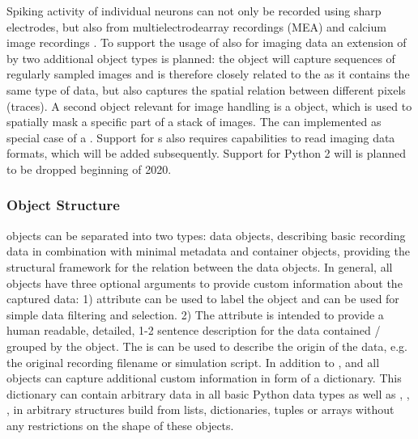 Spiking activity of individual neurons can not only be recorded using sharp electrodes, but also  from multielectrodearray recordings (MEA) and calcium image recordings \citep{kelly_comparison_2007, shew_simultaneous_2010}. To support the usage of  also for imaging data an extension of  by two additional object types is planned: the  object will capture sequences of regularly sampled images and is therefore closely related to the  as it contains the same type of data, but also captures the spatial relation between different pixels (traces). A second object relevant for image handling is a  object, which is used to spatially mask a specific part of a stack of images. The  can implemented as special case of a . Support for s also requires capabilities to read imaging data formats, which will be added subsequently.
Support for Python 2 will is planned to be dropped beginning of 2020.


\subsubsection{ Object Structure}
 objects can be separated into two types: data objects, describing basic recording data in combination with minimal metadata and container objects, providing the structural framework for the relation between the data objects. In general, all  objects have three optional arguments to provide custom information about the captured data: 1)  attribute can be used to label the object and can be used for simple data filtering and selection. 2) The  attribute is intended to provide a human readable, detailed, 1-2 sentence description for the data contained / grouped by the  object. The  is can be used to describe the origin of the data, e.g. the original recording filename or simulation script. In addition to ,  and  all  objects can capture additional custom information in form of a  dictionary. This dictionary can contain arbitrary data in all basic Python data types as well as , , ,  in arbitrary structures build from lists, dictionaries, tuples or  arrays without any restrictions on the shape of these objects.


